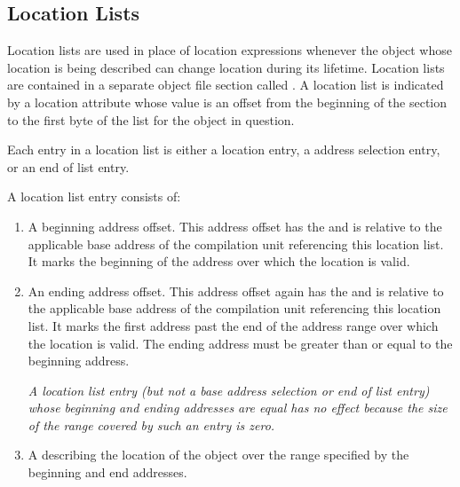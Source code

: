 \subsection{Location Lists}
\label{chap:locationlists}
Location lists 
are used in place of location expressions
whenever the object whose location is being described
can change location during its lifetime. 
Location lists
are contained in a separate object file section called
. A location list is indicated by a location
attribute whose value is an offset from the beginning of
the  section to the first byte of the list for the
object in question.

Each entry in a location list is either a location 
entry,
a 
address selection entry, 
or an 
end of list entry.

A 
location list entry consists of:

\begin{enumerate}[1]
\item A beginning address offset. 
This address offset has the  and is
relative to the applicable base address of the compilation
unit referencing this location list. It marks the beginning
of the address 
over which the location is valid.

\item An ending address offset.  This address offset again
has the  and is relative to the applicable
base address of the compilation unit referencing this location
list. It marks the first address past the end of the address
range over which the location is valid. The ending address
must be greater than or equal to the beginning address.

\textit{A location list entry (but not a base address selection or 
end of list entry) whose beginning
and ending addresses are equal has no effect 
because the size of the range covered by such
an entry is zero.}

\item A  
describing the location of the object over the range specified by
the beginning and end addresses.
\end{enumerate}

